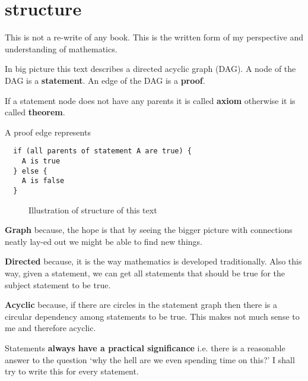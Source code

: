 \documentclass[./main.tex]{subfiles}
\begin{document}
\section{structure}
This is not a re-write of any book.
This is the written form of my perspective and understanding of mathematics.

In big picture this text describes a directed acyclic graph (DAG).
A node of the DAG is a \textbf{statement}.
An edge of the DAG is a \textbf{proof}.

If a statement node does not have any parents it is called \textbf{axiom} otherwise it is called \textbf{theorem}.

A proof edge represents
\begin{verbatim}
  if (all parents of statement A are true) {
    A is true
  } else {
    A is false
  }
\end{verbatim}

\begin{figure}[h]
	\centering
	\caption{Illustration of structure of this text}
	\label{fig:structure_of_text}
\end{figure}

\textbf{Graph} because, the hope is that by seeing the bigger picture with connections neatly lay-ed out we might be able to find new things.

\textbf{Directed} because, it is the way mathematics is developed traditionally. Also this way, given a statement, we can get all statements that should be true for the subject statement to be true.

\textbf{Acyclic} because, if there are circles in the statement graph then there is a circular dependency among statements to be true.
This makes not much sense to me and therefore acyclic.

Statements \textbf{always have a practical significance} i.e. there is a reasonable answer to the question `why the hell are we even spending time on this?' I shall try to write this for every statement.

\pagebreak
\end{document}
